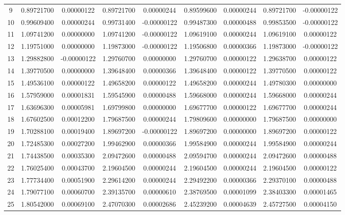 \begin{table}[h]
{\begin{tabular}{ccccccccc}
9      & 0.89721700 & 0.00000122  & 0.89721700 & 0.00000244  & 0.89599600 & 0.00000244 & 0.89721700 & -0.00000122 \\
10     & 0.99609400 & 0.00000244  & 0.99731400 & -0.00000122 & 0.99487300 & 0.00000488 & 0.99853500 & -0.00000122 \\
11     & 1.09741200 & 0.00000000  & 1.09741200 & -0.00000122 & 1.09619100 & 0.00000244 & 1.09619100 & 0.00000122  \\
12     & 1.19751000 & 0.00000000  & 1.19873000 & -0.00000122 & 1.19506800 & 0.00000366 & 1.19873000 & -0.00000122 \\
13     & 1.29882800 & -0.00000122 & 1.29760700 & 0.00000000  & 1.29760700 & 0.00000122 & 1.29638700 & 0.00000122  \\
14     & 1.39770500 & 0.00000000  & 1.39648400 & 0.00000366  & 1.39648400 & 0.00000122 & 1.39770500 & 0.00000122  \\
15     & 1.49536100 & 0.00000122  & 1.49658200 & 0.00000122  & 1.49658200 & 0.00000244 & 1.49780300 & 0.00000000  \\
16     & 1.57959000 & 0.00001831  & 1.59545900 & 0.00000488  & 1.59668000 & 0.00000244 & 1.59668000 & 0.00000244  \\
17     & 1.63696300 & 0.00005981  & 1.69799800 & 0.00000000  & 1.69677700 & 0.00000122 & 1.69677700 & 0.00000244  \\
18     & 1.67602500 & 0.00012200  & 1.79687500 & 0.00000244  & 1.79809600 & 0.00000000 & 1.79687500 & 0.00000000  \\
19     & 1.70288100 & 0.00019400  & 1.89697200 & -0.00000122 & 1.89697200 & 0.00000000 & 1.89697200 & 0.00000122  \\
20     & 1.72485300 & 0.00027200  & 1.99462900 & 0.00000366  & 1.99584900 & 0.00000244 & 1.99584900 & 0.00000244  \\
21     & 1.74438500 & 0.00035300  & 2.09472600 & 0.00000488  & 2.09594700 & 0.00000244 & 2.09472600 & 0.00000488  \\
22     & 1.76025400 & 0.00043700  & 2.19604500 & 0.00000244  & 2.19604500 & 0.00000244 & 2.19604500 & 0.00000122  \\
23     & 1.77734400 & 0.00051900  & 2.29614200 & 0.00000244  & 2.29492200 & 0.00000366 & 2.29370100 & 0.00000488  \\
24     & 1.79077100 & 0.00060700  & 2.39135700 & 0.00000610  & 2.38769500 & 0.00001099 & 2.38403300 & 0.00001465  \\
25     & 1.80542000 & 0.00069100  & 2.47070300 & 0.00002686  & 2.45239200 & 0.00004639 & 2.45727500 & 0.00004150  \\

\end{tabular}}
\end{table}
